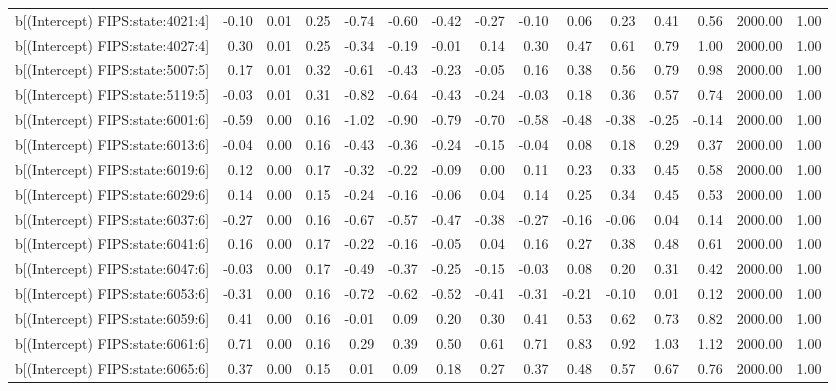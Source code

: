 \begin{table}[ht]
\begin{tabular}{rrrrrrrrrrrrrrr}
  b[(Intercept) FIPS:state:4021:4] & -0.10 & 0.01 & 0.25 & -0.74 & -0.60 & -0.42 & -0.27 & -0.10 & 0.06 & 0.23 & 0.41 & 0.56 & 2000.00 & 1.00 \\ 
  b[(Intercept) FIPS:state:4027:4] & 0.30 & 0.01 & 0.25 & -0.34 & -0.19 & -0.01 & 0.14 & 0.30 & 0.47 & 0.61 & 0.79 & 1.00 & 2000.00 & 1.00 \\ 
  b[(Intercept) FIPS:state:5007:5] & 0.17 & 0.01 & 0.32 & -0.61 & -0.43 & -0.23 & -0.05 & 0.16 & 0.38 & 0.56 & 0.79 & 0.98 & 2000.00 & 1.00 \\ 
  b[(Intercept) FIPS:state:5119:5] & -0.03 & 0.01 & 0.31 & -0.82 & -0.64 & -0.43 & -0.24 & -0.03 & 0.18 & 0.36 & 0.57 & 0.74 & 2000.00 & 1.00 \\ 
  b[(Intercept) FIPS:state:6001:6] & -0.59 & 0.00 & 0.16 & -1.02 & -0.90 & -0.79 & -0.70 & -0.58 & -0.48 & -0.38 & -0.25 & -0.14 & 2000.00 & 1.00 \\ 
  b[(Intercept) FIPS:state:6013:6] & -0.04 & 0.00 & 0.16 & -0.43 & -0.36 & -0.24 & -0.15 & -0.04 & 0.08 & 0.18 & 0.29 & 0.37 & 2000.00 & 1.00 \\ 
  b[(Intercept) FIPS:state:6019:6] & 0.12 & 0.00 & 0.17 & -0.32 & -0.22 & -0.09 & 0.00 & 0.11 & 0.23 & 0.33 & 0.45 & 0.58 & 2000.00 & 1.00 \\ 
  b[(Intercept) FIPS:state:6029:6] & 0.14 & 0.00 & 0.15 & -0.24 & -0.16 & -0.06 & 0.04 & 0.14 & 0.25 & 0.34 & 0.45 & 0.53 & 2000.00 & 1.00 \\ 
  b[(Intercept) FIPS:state:6037:6] & -0.27 & 0.00 & 0.16 & -0.67 & -0.57 & -0.47 & -0.38 & -0.27 & -0.16 & -0.06 & 0.04 & 0.14 & 2000.00 & 1.00 \\ 
  b[(Intercept) FIPS:state:6041:6] & 0.16 & 0.00 & 0.17 & -0.22 & -0.16 & -0.05 & 0.04 & 0.16 & 0.27 & 0.38 & 0.48 & 0.61 & 2000.00 & 1.00 \\ 
  b[(Intercept) FIPS:state:6047:6] & -0.03 & 0.00 & 0.17 & -0.49 & -0.37 & -0.25 & -0.15 & -0.03 & 0.08 & 0.20 & 0.31 & 0.42 & 2000.00 & 1.00 \\ 
  b[(Intercept) FIPS:state:6053:6] & -0.31 & 0.00 & 0.16 & -0.72 & -0.62 & -0.52 & -0.41 & -0.31 & -0.21 & -0.10 & 0.01 & 0.12 & 2000.00 & 1.00 \\ 
  b[(Intercept) FIPS:state:6059:6] & 0.41 & 0.00 & 0.16 & -0.01 & 0.09 & 0.20 & 0.30 & 0.41 & 0.53 & 0.62 & 0.73 & 0.82 & 2000.00 & 1.00 \\ 
  b[(Intercept) FIPS:state:6061:6] & 0.71 & 0.00 & 0.16 & 0.29 & 0.39 & 0.50 & 0.61 & 0.71 & 0.83 & 0.92 & 1.03 & 1.12 & 2000.00 & 1.00 \\ 
  b[(Intercept) FIPS:state:6065:6] & 0.37 & 0.00 & 0.15 & 0.01 & 0.09 & 0.18 & 0.27 & 0.37 & 0.48 & 0.57 & 0.67 & 0.76 & 2000.00 & 1.00 \\ 

\end{tabular}
\end{table}
